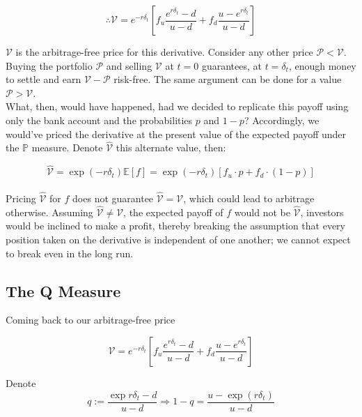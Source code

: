 \documentclass{article}
\begin{document}
\begin{equation} \label{eq:v_price_complete}
    \therefore \mathcal{V} = e^{-r\delta_t}\left[f_u \frac{e^{r\delta_t} - d}{u - d} + f_d \frac{u - e^{r\delta_t}}{u-d}\right]
\end{equation}

$\mathcal{V}$ is the arbitrage-free price for this derivative. Consider any other price $\mathcal{P} < \mathcal{V}$. Buying the portfolio $\mathcal{P}$ and selling $\mathcal{V}$ at $t=0$ guarantees, at $t=\delta_t$, enough money to settle and earn $\mathcal{V}-\mathcal{P}$ risk-free. The same argument can be done for a value $\mathcal{P} > \mathcal{V}$.\\

What, then, would have happened, had we decided to replicate this payoff using only the bank account and the probabilities $p$ and $1-p$? Accordingly, we would've priced the derivative at the present value of the expected payoff under the $\mathbb{P}$ measure. Denote $\hat{\mathcal{V}}$ this alternate value, then:

\begin{equation}
    \hat{\mathcal{V}} = \exp(-r\delta_t)\mathbb{E}[f] = \exp(-r\delta_t)[f_u \cdot p + f_d \cdot (1- p) ]
\end{equation}\\


Pricing $\hat{\mathcal{V}}$ for $f$ does not guarantee $\hat{\mathcal{V}} = \mathcal{V}$, which could lead to arbitrage otherwise. Assuming $\hat{\mathcal{V}} \neq \mathcal{V}$, the expected payoff of $f$ would not be $\hat{\mathcal{V}}$, investors would be inclined to make a profit, thereby breaking the assumption that every position taken on the derivative is independent of one another; we cannot expect to break even in the long run.


\subsection{The Q Measure}
Coming back to our arbitrage-free price 

\begin{equation*}
    \mathcal{V} = e^{-r\delta_t}\left[f_u \frac{e^{r\delta_t} - d}{u - d} + f_d \frac{u - e^{r\delta_t}}{u-d}\right]
\end{equation*}

Denote
\begin{equation}
    q:= \frac{\exp{r\delta_t} - d}{u - d} \Longrightarrow 1-q = \frac{u - \exp{(r\delta_t)}}{u-d}
\end{equation}\\
\end{document}
